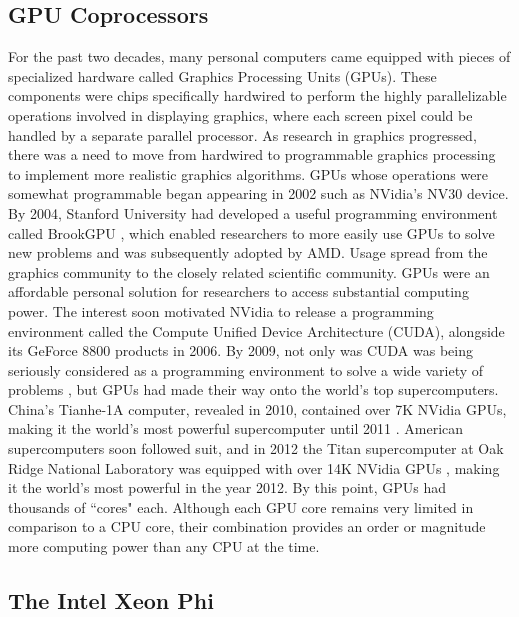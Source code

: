 \subsection{GPU Coprocessors}

For the past two decades, many personal computers came
equipped with pieces of specialized hardware called
Graphics Processing Units (GPUs).
These components were chips specifically hardwired to
perform the highly parallelizable operations involved
in displaying graphics, where each screen pixel could be handled
by a separate parallel processor.
As research in graphics progressed, there was a need to
move from hardwired to programmable graphics processing
to implement more realistic graphics algorithms.
GPUs whose operations were somewhat programmable began appearing
in 2002 such as NVidia's NV30 device.
By 2004, Stanford University had developed a useful programming
environment called BrookGPU \cite{buck2004brook}, which
enabled researchers to more easily use GPUs to solve new problems
and was subsequently adopted by AMD.
Usage spread from the graphics community to the closely
related scientific community.
GPUs were an affordable personal solution for researchers
to access substantial computing power.
The interest soon motivated NVidia to release a programming
environment called the Compute Unified Device Architecture (CUDA),
alongside its GeForce 8800 products in 2006.
By 2009, not only was CUDA was being seriously considered as a programming
environment to solve a wide variety of problems \cite{hwu2009compute},
but GPUs had made their way onto the world's top supercomputers.
China's Tianhe-1A computer, revealed in 2010,
contained over 7K NVidia GPUs, making it the world's
most powerful supercomputer until 2011 \cite{yang2011tianhe}.
American supercomputers soon followed suit, and in 2012
the Titan supercomputer at Oak Ridge National Laboratory
was equipped with over 14K NVidia GPUs \cite{bland2012titan},
making it the world's most powerful in the year 2012.
By this point, GPUs had thousands of ``cores" each.
Although each GPU core remains very limited in comparison to a
CPU core, their combination provides an order or magnitude
more computing power than any CPU at the time.

\subsection{The Intel Xeon Phi}

